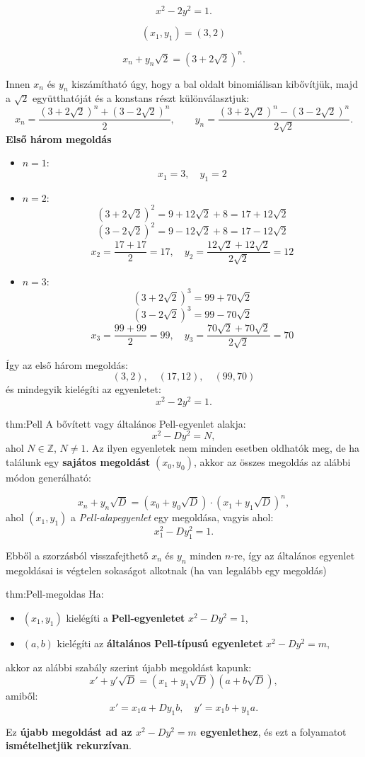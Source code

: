 \begin{solution}
\[
x^{2}-2y^{2}=1.
\]

\[
(x_{1},y_{1})=(3,2)
\]

\[
x_{n}+y_{n}\sqrt{2}=(3+2\sqrt{2})^{n}.
\]

Innen $x_{n}$ és $y_{n}$ kiszámítható úgy, hogy a bal oldalt binomiálisan
kibővítjük, majd a $\sqrt{2}$ együtthatóját és a konstans részt különválasztjuk:
\[
x_{n}=\frac{(3+2\sqrt{2})^{n}+(3-2\sqrt{2})^{n}}{2},\qquad y_{n}=\frac{(3+2\sqrt{2})^{n}-(3-2\sqrt{2})^{n}}{2\sqrt{2}}.
\]
\textbf{Első három megoldás}\\
\begin{itemize}
\item $n=1$: 
\[
x_{1}=3,\quad y_{1}=2
\]
\item $n=2$: 
\[
(3+2\sqrt{2})^{2}=9+12\sqrt{2}+8=17+12\sqrt{2}
\]
\[
(3-2\sqrt{2})^{2}=9-12\sqrt{2}+8=17-12\sqrt{2}
\]
\[
x_{2}=\frac{17+17}{2}=17,\quad y_{2}=\frac{12\sqrt{2}+12\sqrt{2}}{2\sqrt{2}}=12
\]
\item $n=3$: 
\[
(3+2\sqrt{2})^{3}=99+70\sqrt{2}
\]
\[
(3-2\sqrt{2})^{3}=99-70\sqrt{2}
\]
\[
x_{3}=\frac{99+99}{2}=99,\quad y_{3}=\frac{70\sqrt{2}+70\sqrt{2}}{2\sqrt{2}}=70
\]
\end{itemize}
Így az első három megoldás: 
\[
(3,2),\quad(17,12),\quad(99,70)
\]
és mindegyik kielégíti az egyenletet: 
\[
x^{2}-2y^{2}=1.
\]
\end{solution}
\begin{theorem}{thm:Pell}
A bővített vagy általános Pell-egyenlet alakja: 
\[
x^{2}-Dy^{2}=N,
\]
ahol $N\in\mathbb{Z}$, $N\neq1$. Az ilyen egyenletek nem minden
esetben oldhatók meg, de ha találunk egy \textbf{sajátos megoldást}
$(x_{0},y_{0})$, akkor az összes megoldás az alábbi módon generálható:

\[
x_{n}+y_{n}\sqrt{D}=(x_{0}+y_{0}\sqrt{D})\cdot(x_{1}+y_{1}\sqrt{D})^{n},
\]
ahol $(x_{1},y_{1})$ a \emph{Pell-alapegyenlet} egy megoldása, vagyis
ahol: 
\[
x_{1}^{2}-Dy_{1}^{2}=1.
\]

Ebből a szorzásból visszafejthető $x_{n}$ és $y_{n}$ minden $n$-re,
így az általános egyenlet megoldásai is végtelen sokaságot alkotnak
(ha van legalább egy megoldás) 
\end{theorem}

\begin{theorem}{thm:Pell-megoldas}
Ha:
\begin{itemize}
\item $(x_{1},y_{1})$ kielégíti a \textbf{Pell-egyenletet} $x^{2}-Dy^{2}=1$, 
\item $(a,b)$ kielégíti az \textbf{általános Pell-típusú egyenletet} $x^{2}-Dy^{2}=m$, 
\end{itemize}
akkor az alábbi szabály szerint újabb megoldást kapunk: 
\[
x'+y'\sqrt{D}=(x_{1}+y_{1}\sqrt{D})(a+b\sqrt{D}),
\]
amiből: 
\[
x'=x_{1}a+Dy_{1}b,\quad y'=x_{1}b+y_{1}a.
\]

Ez \textbf{újabb megoldást ad az $x^{2}-Dy^{2}=m$ egyenlethez}, és
ezt a folyamatot \textbf{ismételhetjük rekurzívan}. 
\end{theorem}


